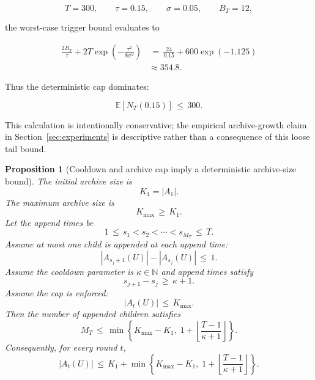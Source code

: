 \documentclass{article} %
\newtheorem{proposition}[theorem]{Proposition}
\begin{document}
\begin{equation}
\label{eq:app-six-trigger-example-constants}
T=300,
\qquad
\tau=0.15,
\qquad
\sigma=0.05,
\qquad
B_T=12,
\end{equation}

the worst-case trigger bound evaluates to

\begin{align}
\label{eq:app-six-trigger-example-eval}
\frac{2B_T}{\tau}
+
2T\exp\!\left(-\frac{\tau^2}{8\sigma^2}\right)
&\,=\,
\frac{24}{0.15}
+
600\exp(-1.125)
\\
&\approx
354.8.
\end{align}

Thus the deterministic cap dominates:

\begin{equation}
\label{eq:app-six-trigger-example-cap}
\mathbb{E}[N_T(0.15)]
\,\le\,
300.
\end{equation}

This calculation is intentionally conservative; the empirical archive-growth claim in Section~\ref{sec:experiments} is descriptive rather than a consequence of this loose tail bound.

\begin{proposition}[Cooldown and archive cap imply a deterministic archive-size bound]
\label{prop:15}
The initial archive size is
\begin{equation}
\label{eq:app-six-K1}
K_1=|A_1|.
\end{equation}
The maximum archive size is
\begin{equation}
\label{eq:app-six-Kmax}
K_{\max}\,\ge\, K_1.
\end{equation}
Let the append times be
\begin{equation}
\label{eq:app-six-append-times}
1\,\le\, s_1<s_2<\cdots<s_{M_T}\,\le\, T.
\end{equation}
Assume at most one child is appended at each append time:
\begin{equation}
\label{eq:app-six-one-child}
|A_{s_j+1}(U)|-|A_{s_j}(U)|\,\le\, 1.
\end{equation}
Assume the cooldown parameter is \(\kappa\in\mathbb{N}\) and append times satisfy
\begin{equation}
\label{eq:app-six-cooldown-condition}
s_{j+1}-s_j\,\ge\, \kappa+1.
\end{equation}
Assume the cap is enforced:
\begin{equation}
\label{eq:app-six-cap-condition}
|A_t(U)|\,\le\, K_{\max}.
\end{equation}
Then the number of appended children satisfies
\begin{equation}
\label{eq:app-six-MT-bound}
M_T
\,\le\,
\min\!\left\{
K_{\max}-K_1,\;
1+\left\lfloor\frac{T-1}{\kappa+1}\right\rfloor
\right\}.
\end{equation}
Consequently, for every round \(t\),
\begin{equation}
\label{eq:app-six-archive-size-bound}
|A_t(U)|
\,\le\,
K_1+
\min\!\left\{
K_{\max}-K_1,\;
1+\left\lfloor\frac{T-1}{\kappa+1}\right\rfloor
\right\}.
\end{equation}
\end{proposition}
\end{document}
